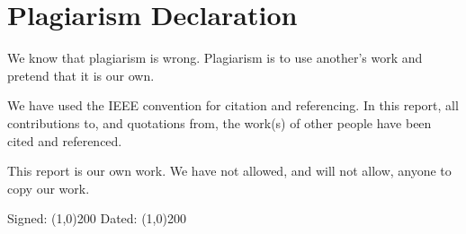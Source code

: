\chapter*{Plagiarism Declaration}
We know that plagiarism is wrong. Plagiarism is to use another's work and pretend that it is our own.

We have used the IEEE convention for citation and referencing. In this report, all contributions to, and quotations from, the work(s) of other people have been cited and referenced. 

This report is our own work. We have not allowed, and will not allow, anyone to copy our work.
\vskip100pt
\begin{center}
	Signed: \line(1,0){200}
	\vskip20pt
	Dated: \line(1,0){200}
\end{center}

\newpage